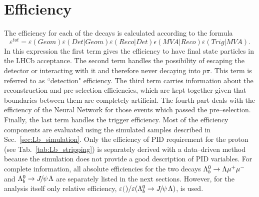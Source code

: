 \chapter{Efficiency}
\label{sec:Lb_eff}

The efficiency for each of the decays is calculated according to the formula
\begin{equation}
\varepsilon^{tot}=\varepsilon(Geom)\varepsilon(Det|Geom)\varepsilon(Reco|Det)\epsilon(MVA|Reco)\varepsilon(Trig|MVA).
\end{equation}
In this expression the first term gives the efficiency to have final state particles in the LHCb acceptance.
The second term handles the possibility of \Lz escaping the detector or interacting with it and therefore
never decaying into $p\pi$. This term is referred to as ``detection" efficiency.
The third term carries information about the reconstruction and pre-selection efficiencies,
which are kept together given that boundaries between them are completely artificial.
The fourth part deals with the efficiency of the Neural Network for those events which passed the pre--selection. 
Finally, the last term handles the trigger efficiency.
Most of the efficiency components are evaluated using the simulated samples described in Sec.~\ref{sec:Lb_simulation}.
Only the efficiency of PID requirement for the proton (see Tab.~\ref{tab:Lb_stripping}) is separately derived
with a data--driven method because the simulation does not provide a good description of PID variables.
For complete information, all absolute efficiencies for the two decays $\Lambda^0_b\rightarrow\Lambda\mu^+\mu^-$ and $\Lb\to\jpsi\Lz$ are
separately listed in the next sections. However, for the analysis itself only relative efficiency,
$\varepsilon($\Lb\to\Lz\mumu$)/\varepsilon(\Lb\to\jpsi\Lz)$, is used. 



